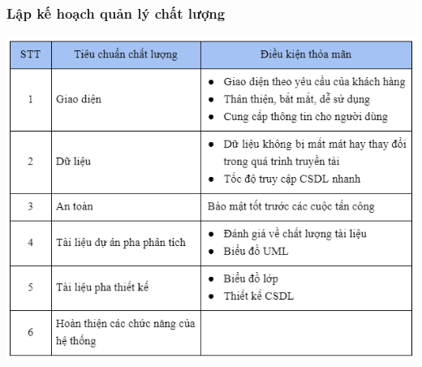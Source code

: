 \documentclass[12pt]{article}
\begin{document}
\subsubsection{Lập kế hoạch quản lý chất lượng}
\includegraphics[width=15cm]{II_5_4.png}
\end{document}
